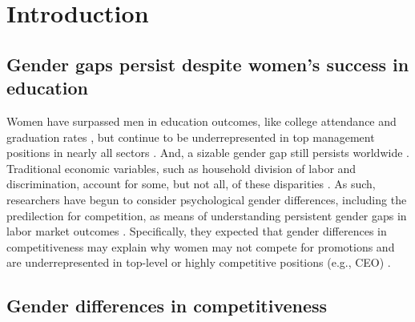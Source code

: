 \documentclass[a4paper, nobind]{templates/ociamthesis}
\begin{document}
\hypertarget{introduction-1}{%
\section{Introduction}\label{introduction-1}}

\hypertarget{gender-gaps-persist-despite-womens-success-in-education}{%
\subsection{Gender gaps persist despite women's success in education}\label{gender-gaps-persist-despite-womens-success-in-education}}

Women have surpassed men in education outcomes, like college attendance and graduation rates \autocite{Blau2017,Goldin2006,Stoet2014}, but continue to be underrepresented in top management positions in nearly all sectors \autocite{Bertrand2001}. And, a sizable gender gap still persists worldwide \autocite{Blau2017}. Traditional economic variables, such as household division of labor and discrimination, account for some, but not all, of these disparities \autocite{Blau2017}. As such, researchers have begun to consider psychological gender differences, including the predilection for competition, as means of understanding persistent gender gaps in labor market outcomes \autocite[for review, see][]{Niederle2011}. Specifically, they expected that gender differences in competitiveness may explain why women may not compete for promotions and are underrepresented in top-level or highly competitive positions (e.g., CEO) \autocite{Niederle2007}.

\hypertarget{gender-differences-in-competitiveness}{%
\subsection{Gender differences in competitiveness}\label{gender-differences-in-competitiveness}}
\end{document}
